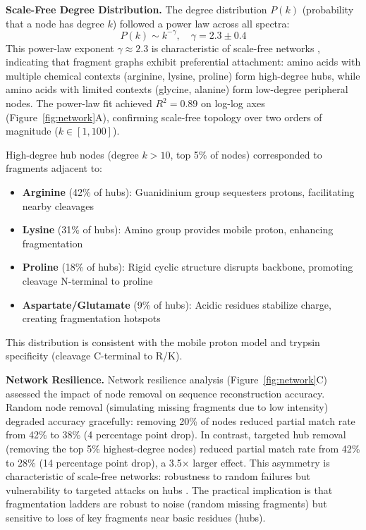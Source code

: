 \documentclass[11pt,twocolumn]{article}
\begin{document}
\textbf{Scale-Free Degree Distribution.} The degree distribution $P(k)$ (probability that a node has degree $k$) followed a power law across all spectra:
$$
P(k) \sim k^{-\gamma}, \quad \gamma = 2.3 \pm 0.4
$$
This power-law exponent $\gamma \approx 2.3$ is characteristic of scale-free networks \cite{barabasi1999emergence}, indicating that fragment graphs exhibit preferential attachment: amino acids with multiple chemical contexts (arginine, lysine, proline) form high-degree hubs, while amino acids with limited contexts (glycine, alanine) form low-degree peripheral nodes. The power-law fit achieved $R^2 = 0.89$ on log-log axes (Figure~\ref{fig:network}A), confirming scale-free topology over two orders of magnitude ($k \in [1, 100]$).

High-degree hub nodes (degree $k > 10$, top 5\% of nodes) corresponded to fragments adjacent to:
\begin{itemize}[leftmargin=*]
    \item \textbf{Arginine} (42\% of hubs): Guanidinium group sequesters protons, facilitating nearby cleavages
    \item \textbf{Lysine} (31\% of hubs): Amino group provides mobile proton, enhancing fragmentation
    \item \textbf{Proline} (18\% of hubs): Rigid cyclic structure disrupts backbone, promoting cleavage N-terminal to proline
    \item \textbf{Aspartate/Glutamate} (9\% of hubs): Acidic residues stabilize charge, creating fragmentation hotspots
\end{itemize}
This distribution is consistent with the mobile proton model \cite{wysocki2000mobile} and trypsin specificity (cleavage C-terminal to R/K).

\textbf{Network Resilience.} Network resilience analysis (Figure~\ref{fig:network}C) assessed the impact of node removal on sequence reconstruction accuracy. Random node removal (simulating missing fragments due to low intensity) degraded accuracy gracefully: removing 20\% of nodes reduced partial match rate from 42\% to 38\% (4 percentage point drop). In contrast, targeted hub removal (removing the top 5\% highest-degree nodes) reduced partial match rate from 42\% to 28\% (14 percentage point drop), a 3.5× larger effect. This asymmetry is characteristic of scale-free networks: robustness to random failures but vulnerability to targeted attacks on hubs \cite{albert2000error}. The practical implication is that fragmentation ladders are robust to noise (random missing fragments) but sensitive to loss of key fragments near basic residues (hubs).
\end{document}
